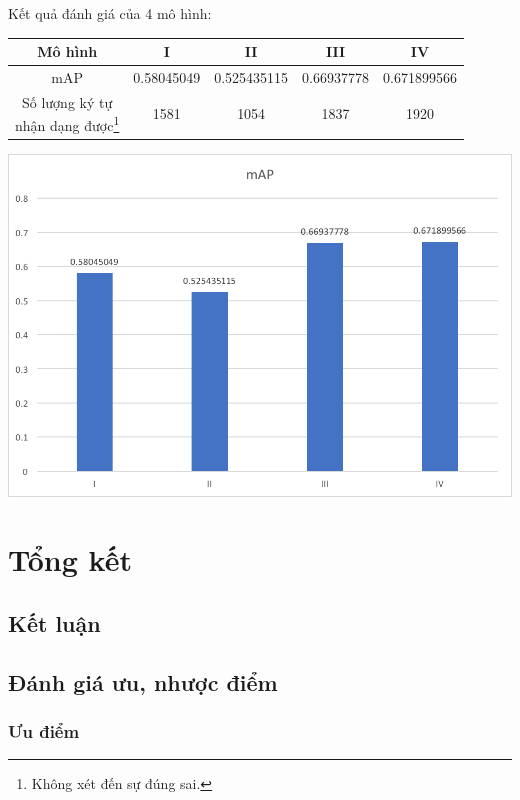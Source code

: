 \documentclass[a4paper,12pt]{article}
\begin{document}
	Kết quả đánh giá của 4 mô hình:
	\begin{center}
		\begin{tabular}{||c | c | c | c | c||} 
			\hline
			Mô hình & I&II&III&IV\\[0.5ex] 
			\hline\hline
			mAP&0.58045049&0.525435115&0.66937778&0.671899566\\
			\hline
			\makecell{Số lượng ký tự\\ nhận dạng được\footnote{Không xét đến sự đúng sai.}}&1581&1054&1837&1920\\
			\hline
		\end{tabular}
	\end{center}
	\begin{center}
		\centering
		\includegraphics[width=0.775\linewidth]{mAP.png}
		\vspace{0.5cm}
		
	\end{center}
	
	\newpage	
	\section{Tổng kết}
	
	\subsection{Kết luận}
	\subsection{Đánh giá ưu, nhược điểm}
	
	\subsubsection{Ưu điểm}
	
\end{document}
